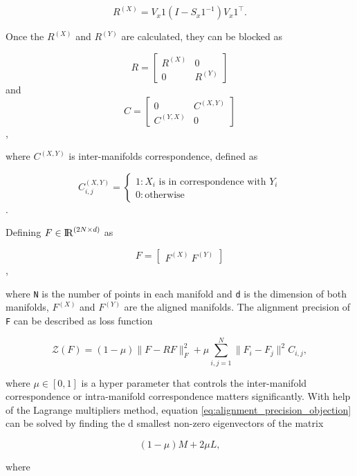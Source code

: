 \documentclass[11pt,a4paper]{article}
\begin{document}
  \begin{equation}
  R^{(X)}=V_x1(I-S_x1^{-1})V_x1^\intercal.
  \end{equation}

  Once the $R^{(X)}$ and $R^{(Y)}$ are calculated, they can be blocked as
  
  \[R= \begin{bmatrix}
      R^{(X)} & 0 \\
      0 & R^{(Y)}
      \end{bmatrix}\] and 
  \[C=\begin{bmatrix}
      0 & C^{(X,Y)}\\
      C^{(Y,X)} & 0
      \end{bmatrix}\],

  where $C^{(X,Y)}$ is inter-manifolds correspondence, defined as

  \[C_{i,j}^{(X,Y)}=\begin{cases}
                    1 : X_i\text{ is in correspondence with }Y_i\\
                    0 : \text{otherwise}
                    \end{cases}\].

  Defining $F\in {\rm I\!R}^{(2N\times d)}$ as

  \[F=\begin{bmatrix}
      F^{(X)}\
      F^{(Y)}
      \end{bmatrix}\],

  where \verb|N| is the number of points in each manifold and \verb|d| is the dimension of both manifolds, $F^{(X)}$ and $F^{(Y)}$ are the aligned manifolds. The alignment precision of \verb|F| can be described as loss function

  \begin{equation}\label{eq:alignment_precision_objection}
  \mathcal{Z}(F)=(1-\mu )\|F-RF\|^2_F+\mu\sum_{i,j=1}^N\|F_i-F_j\|^2C_{i,j},
  \end{equation}

  where $\mu\in[0,1]$ is a hyper parameter that controls the inter-manifold correspondence or intra-manifold correspondence matters significantly. With help of the Lagrange multipliers method, equation \eqref{eq:alignment_precision_objection} can be solved by finding the d smallest non-zero eigenvectors of the matrix

  \begin{equation}
  (1-\mu)M+2\mu L,
  \end{equation}

  where
\end{document}
